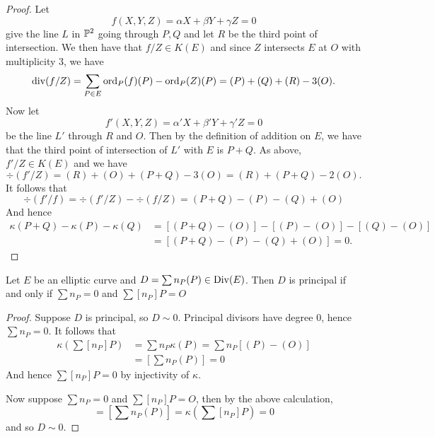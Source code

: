 \begin{proof}
	Let
	\begin{equation*}
		f(X, Y, Z) = \alpha X + \beta Y + \gamma Z = 0
	\end{equation*}
	give the line $L$ in $\mathbb{P}^2$ going through $P, Q$ and let $R$ be the third
	point of intersection.
	We then have that $f/Z \in K(E)$ and since $Z$ intersects $E$ at $O$ with
	multiplicity 3, we have
	\begin{equation*}
		\operatorname{div}(f/Z) = \sum_{P \in E}\operatorname{ord}_P(f)(P) - \operatorname{ord}_P(Z)(P)
		= (P) + (Q) + (R) - 3(O).
	\end{equation*}
	Now let 
	\begin{equation*}
		f'(X, Y, Z) = \alpha' X + \beta' Y + \gamma' Z = 0
	\end{equation*}
	be the line $L'$ through $R$ and $O$. Then by the definition of addition on
	$E$, we have that the third point of intersection of $L'$ with $E$ is 
	$P + Q$. As above, $f'/Z \in K(E)$ and we have
	\begin{equation*}
		\div(f'/Z) = (R) + (O) + (P + Q) - 3(O) = (R) + (P + Q) - 2(O).
	\end{equation*}
	It follows that
	\begin{equation*}
		\div(f'/f) = \div(f'/Z) - \div(f/Z) = (P + Q) - (P) - (Q) + (O)
	\end{equation*}
	And hence
	\begin{align*}
		\kappa(P + Q) - \kappa(P) - \kappa(Q) &= 
		[(P + Q) - (O)] - [(P) - (O)] - [(Q) - (O)]\\
		&= [(P + Q) - (P) - (Q) + (O)] = 0.
	\end{align*}
\end{proof}

\begin{corollary}
	Let $E$ be an elliptic curve and $D = \sum n_P(P) \in \operatorname{Div}(E)$. Then $D$
	is principal if and only if $\sum n_P = 0$ and $\sum [n_P]P = O$
\end{corollary}

\begin{proof}
	Suppose $D$ is principal, so $D\sim 0$. 
	Principal divisors have degree $0$,
	hence $\sum n_P = 0$. It follows that
	\begin{align*}
		\kappa\left(\sum [n_P]P\right) &= \sum n_P\kappa(P) = \sum n_P [(P) -
		(O)]\\
		&= \left[\sum n_P (P)\right] = 0
	\end{align*}
	And hence $\sum [n_P]P = 0$ by injectivity of $\kappa$.

	Now suppose $\sum n_P = 0$ and $\sum [n_P] P = O$,
	then by the above calculation,
	\begin{equation*}
		[D] = \left[\sum n_P(P)\right] = \kappa\left(\sum [n_P] P\right) = 0
	\end{equation*}
	and so $D \sim 0$.
\end{proof}

